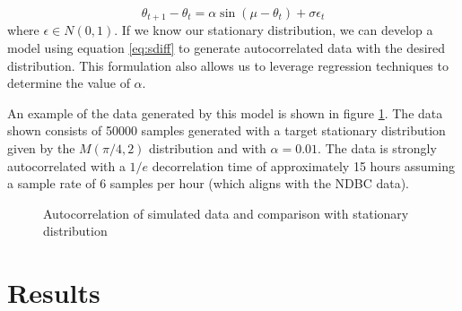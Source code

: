 \documentclass[11pt]{article}
\numberwithin{equation}{section}
\numberwithin{figure}{section}
\begin{document}
\begin{equation}\label{eq:sdiff}
\theta_{t+1} - \theta_t = \alpha \sin( \mu - \theta_t )+\sigma \epsilon_t
\end{equation}
where $\epsilon \in N(0,1)$. If we know our stationary distribution, we can develop a model using equation \ref{eq:sdiff} to generate autocorrelated data with the desired distribution. This formulation also allows us to leverage regression techniques to determine the value of $\alpha$. 

An example of the data generated by this model is shown in figure \ref{fig:sdfig}. The data shown consists of 50000 samples generated with a target stationary distribution given by the $M(\pi/4, 2)$ distribution and with $\alpha = 0.01$. The data is strongly autocorrelated with a $1/e$ decorrelation time of approximately 15 hours assuming a sample rate of 6 samples per hour (which aligns with the NDBC data). 

\begin{figure}[h]
\centering
{}
\caption{Autocorrelation of simulated data and comparison with stationary distribution}\label{fig:sdfig}
\end{figure}

\section{Results}
\end{document}
